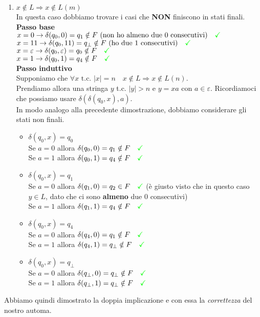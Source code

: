 \documentclass[a4paper,oneside]{scrbook}
\newcommand{\greenmark}{\quad \textcolor{green}{\checkmark}}
\begin{document}
\begin{enumerate}
	\item $x\notin L \Rightarrow x \notin L(m)$\\
	In questa caso dobbiamo trovare i casi che \textbf{NON} finiscono in stati finali.\\
	\textbf{Passo base}\\
	$x=0 \rightarrow \delta(q_0,0)=q_1 \notin F \text{ (non ho almeno due 0 consecutivi)} \greenmark$\\
	$x=11 \rightarrow \delta(q_0,11)=q_\bot \notin F \text{ (ho due 1 consecutivi)} \greenmark$\\
	$x=\varepsilon \rightarrow \delta(q_0,\varepsilon)=q_0 \notin F \greenmark$\\
	$x=1 \rightarrow \delta(q_0,1)=q_4 \notin F \greenmark$\\
	\textbf{Passo induttivo}\\
	Supponiamo che $\forall x \text{ t.c. } |x|=n \quad x \notin L \Rightarrow x\notin L(n)$.\\
	Prendiamo allora una stringa $y$ t.c. $|y|>n$ e $y=xa \text{ con }a\in\varepsilon$. Ricordiamoci che possiamo usare $\delta(\delta(q_0,x),a)$.\\
	In modo analogo alla precedente dimostrazione, dobbiamo considerare gli stati non finali.
	\begin{itemize}
		\item $\delta(q_0,x)=q_0$\\
		Se $a=0$ allora $\delta(q_0,0)=q_1 \notin F \greenmark$\\
		Se $a=1$ allora $\delta(q_0,1)=q_4 \notin F \greenmark$
		\item $\delta(q_0,x)=q_1$\\
		Se $a=0$ allora $\delta(q_1,0)=q_2 \in F \greenmark$ (è giusto visto che in questo caso $y\in L$, dato che ci sono \textbf{almeno} due 0 consecutivi)\\
		Se $a=1$ allora $\delta(q_1,1)=q_4 \notin F \greenmark$
		\item $\delta(q_0,x)=q_4$\\
		Se $a=0$ allora $\delta(q_4,0)=q_1 \notin F \greenmark$\\
		Se $a=1$ allora $\delta(q_4,1)=q_\bot \notin F \greenmark$
		\item $\delta(q_0,x)=q_\bot$\\
		Se $a=0$ allora $\delta(q_\bot,0)=q_\bot \notin F \greenmark$\\
		Se $a=1$ allora $\delta(q_\bot,1)=q_\bot \notin F \greenmark$
	\end{itemize}
\end{enumerate}
Abbiamo quindi dimostrato la doppia implicazione e con essa la \textit{correttezza} del nostro automa.
\end{document}
